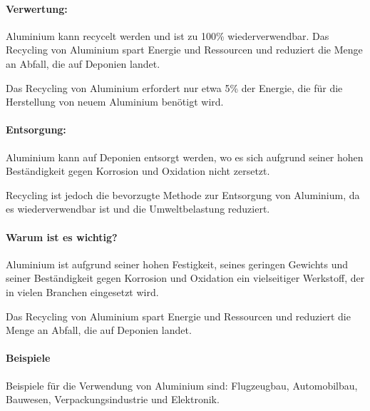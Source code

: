 \documentclass{article}
\begin{document}
\begin{multicols}{3}
\paragraph{Verwertung:}
\begin{compactitem}
\item Aluminium kann recycelt werden und ist zu 100\% wiederverwendbar. Das
  Recycling von Aluminium spart Energie und Ressourcen und reduziert die Menge
  an Abfall, die auf Deponien landet.
\item Das Recycling von Aluminium erfordert nur etwa 5\% der Energie, die für
  die Herstellung von neuem Aluminium benötigt wird.
\end{compactitem}

\paragraph{Entsorgung:}
\begin{compactitem}
\item Aluminium kann auf Deponien entsorgt werden, wo es sich aufgrund seiner
  hohen Beständigkeit gegen Korrosion und Oxidation nicht zersetzt.
\item Recycling ist jedoch die bevorzugte Methode zur Entsorgung von Aluminium,
  da es wiederverwendbar ist und die Umweltbelastung reduziert.
\end{compactitem}

\paragraph{Warum ist es wichtig?}
\begin{compactitem}
\item Aluminium ist aufgrund seiner hohen Festigkeit, seines geringen Gewichts
  und seiner Beständigkeit gegen Korrosion und Oxidation ein vielseitiger
  Werkstoff, der in vielen Branchen eingesetzt wird.
\item Das Recycling von Aluminium spart Energie und Ressourcen und reduziert die Menge an Abfall, die auf Deponien landet.
\end{compactitem}

\paragraph{Beispiele}
Beispiele für die Verwendung von Aluminium sind: Flugzeugbau, Automobilbau,
Bauwesen, Verpackungsindustrie und Elektronik.
\end{multicols}
\end{document}
